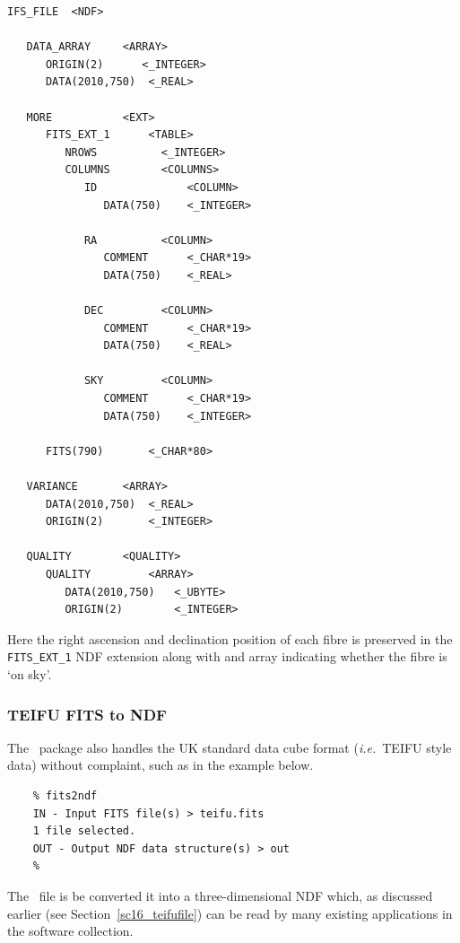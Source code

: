 \documentclass[twoside,11pt]{article}
\newcommand{\htmlref}[2]{#1}
\newcommand{\xref}[3]{#1}
\newcommand{\latex}[1]{#1}
\begin{document}
\small\begin{verbatim}
IFS_FILE  <NDF>

   DATA_ARRAY     <ARRAY>
      ORIGIN(2)      <_INTEGER>
      DATA(2010,750)  <_REAL>

   MORE           <EXT>
      FITS_EXT_1      <TABLE>
         NROWS          <_INTEGER>
         COLUMNS        <COLUMNS>
            ID              <COLUMN>
               DATA(750)    <_INTEGER>

            RA          <COLUMN>
               COMMENT      <_CHAR*19>
               DATA(750)    <_REAL>

            DEC         <COLUMN>
               COMMENT      <_CHAR*19>
               DATA(750)    <_REAL>

            SKY         <COLUMN>
               COMMENT      <_CHAR*19>
               DATA(750)    <_INTEGER> 

      FITS(790)       <_CHAR*80>

   VARIANCE       <ARRAY> 
      DATA(2010,750)  <_REAL>
      ORIGIN(2)       <_INTEGER>

   QUALITY        <QUALITY>
      QUALITY         <ARRAY>
         DATA(2010,750)   <_UBYTE>
         ORIGIN(2)        <_INTEGER>
\end{verbatim}\normalsize

Here the right ascension and declination position of each fibre is preserved in the
{\tt FITS\_EXT\_1} NDF extension along with and array indicating
whether the fibre is `on sky'.

\subsubsection{TEIFU FITS to NDF}

The \CONVERTref\ package also handles the UK standard data
cube format (\emph{i.e.}\ TEIFU style data) without complaint, such as
in the example below.

\begin{verbatim}
    % fits2ndf
    IN - Input FITS file(s) > teifu.fits
    1 file selected.
    OUT - Output NDF data structure(s) > out
    % 
\end{verbatim}

The \FITSref\ file is be converted it into a three-dimensional
\xref{NDF}{sun33}{} which, as \htmlref{discussed
earlier}{sc16_teifufile}\latex{ (see
Section~\ref{sc16_teifufile})} can be read by many existing
applications in the software collection.
\end{document}

